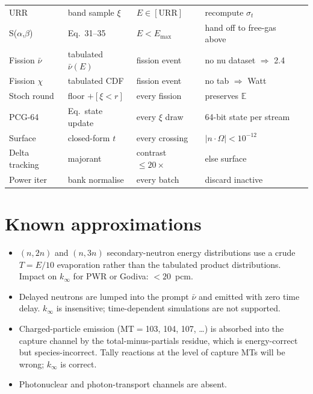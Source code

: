 \documentclass[11pt,a4paper]{article}
\begin{document}
\begin{longtable}{@{}lllll@{}}
URR & band sample $\xi$ & $E \in [\mathrm{URR}]$ & recompute $\sigma_t$ \\
S($\alpha$,$\beta$) & Eq.~31--35 & $E < E_\mathrm{max}$ & hand off to free-gas above \\
Fission $\bar\nu$ & tabulated $\bar\nu(E)$ & fission event & no nu dataset $\Rightarrow$ 2.4 \\
Fission $\chi$ & tabulated CDF & fission event & no tab $\Rightarrow$ Watt \\
Stoch round & floor $+ [\xi < r]$ & every fission & preserves $\mathbb{E}$ \\
PCG-64 & Eq.~state update & every $\xi$ draw & 64-bit state per stream \\
Surface & closed-form $t$ & every crossing & $|n\cdot\Omega| < 10^{-12}$ \\
Delta tracking & majorant & contrast $\leq 20\times$ & else surface \\
Power iter & bank normalise & every batch & discard inactive \\
\bottomrule
\end{longtable}

\section*{Known approximations}

\begin{itemize}
  \item $(n,2n)$ and $(n,3n)$ secondary-neutron energy
  distributions use a crude $T = E/10$ evaporation rather than
  the tabulated product distributions. Impact on $k_\infty$ for
  PWR or Godiva: $< 20$~pcm.
  \item Delayed neutrons are lumped into the prompt
  $\bar\nu$ and emitted with zero time delay. $k_\infty$ is
  insensitive; time-dependent simulations are not supported.
  \item Charged-particle emission (MT$=$103, 104, 107, \ldots)
  is absorbed into the capture channel by the total-minus-partials
  residue, which is energy-correct but species-incorrect. Tally
  reactions at the level of capture MTs will be wrong; $k_\infty$
  is correct.
  \item Photonuclear and photon-transport channels are absent.
\end{itemize}
\end{document}
